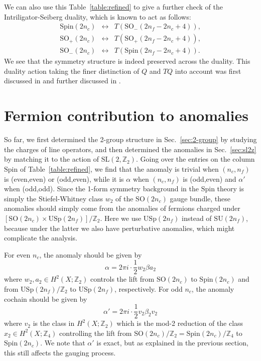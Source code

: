 \documentclass[12pt]{article}
\numberwithin{equation}{section}
\def\bZ{\mathbb{Z}}
\def\SU{\mathrm{SU}}
\def\SO{\mathrm{SO}}
\def\USp{\mathrm{USp}}
\def\Spin{\mathrm{Spin}}
\def\SL{\mathrm{SL}}
\begin{document}
We can also use this Table~\ref{table:refined}
to give a further check of the Intriligator-Seiberg duality,
which is known to act as follows:
\begin{equation}
\renewcommand{\arraystretch}{1.1}
\begin{array}{ccc}
	\Spin(2n_c) & \leftrightarrow & T(\SO_-(2n_f-2n_c+4)),\\
	\SO_+(2n_c) & \leftrightarrow & T(\SO_+(2n_f-2n_c+4)),\\ 
	\SO_-(2n_c) & \leftrightarrow & T(\Spin(2n_f-2n_c+4)).
\end{array}
\end{equation} 
We see that the symmetry structure is indeed preserved across the duality.
This duality action  taking  the finer distinction of $Q$ and $TQ$ into account was
first discussed in \cite[Sec.~6]{Gaiotto:2014kfa} and further discussed in \cite{Bhardwaj:2020ymp}.


\section{Fermion contribution to anomalies}
\label{sec:fermion}
So far, we first determined the 2-group structure in Sec.~\ref{sec:2-group} by studying the charges of line operators,
and then determined the anomalies in Sec.~\ref{sec:sl2z} by matching it to the action of $\SL(2,\bZ_2)$.
Going over  the entries on the column $\Spin$ of Table~\ref{table:refined},
we find that the anomaly is trivial when $(n_c,n_f)$ is (even,even) or (odd,even),
while it is $\alpha$ when $(n_c,n_f)$ is (odd,even) and $\alpha'$ when (odd,odd).
Since the 1-form symmetry background in the $\Spin$ theory is simply the Stiefel-Whitney class $w_2$ of the $\SO(2n_c)$ gauge bundle, 
these anomalies should simply come from the anomalies of fermions charged under $[\SO(2n_c)\times \USp(2n_f)]/\bZ_2$.
Here we use $\USp(2n_f)$ instead of $\SU(2n_f)$, because under the latter we also have perturbative anomalies, which might complicate the analysis.

For even $n_c$, the anomaly should be given by  \begin{equation}
\alpha= 2\pi i \cdot \frac12 w_2 \beta a_2
\end{equation}
where $w_2,a_2\in H^2(X;\bZ_2)$ controls the lift from $\SO(2n_c)$ to $\Spin(2n_c)$
and from $\USp(2n_f)/\bZ_2$ to $\USp(2n_f)$, respectively.
For odd $n_c$, the anomaly cochain should be given by 
 \begin{equation}
\alpha'=2\pi i \cdot \frac12 v_2 \beta_2 v_2
\end{equation} where $v_2$ is the class in $H^2(X;\bZ_2)$ which is the mod-2 reduction of
the class $x_2 \in H^2(X;\bZ_4)$ controlling the lift from $\SO(2n_c)/\bZ_2=\Spin(2n_c)/\bZ_4$ to $\Spin(2n_c)$.
We note that $\alpha'$ is exact, but as explained in the previous section, this still affects the gauging process.
\end{document}
